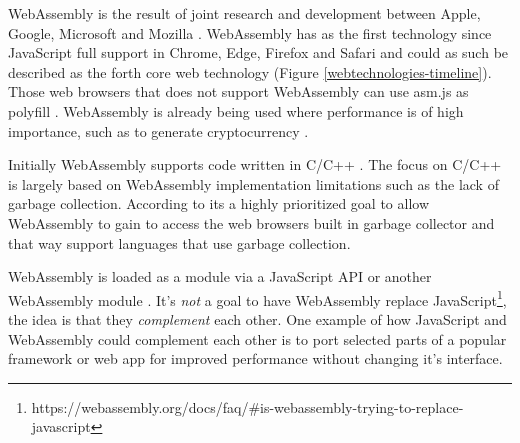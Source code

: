 
WebAssembly is the result of joint research and development between Apple, Google, Microsoft and Mozilla \parencite{HaasRossbergSchuffTitzerHolmanGohmanWagnerZakaiBastien2017}. WebAssembly has as the first technology since JavaScript full support in Chrome, Edge, Firefox and Safari and could as such be described as the forth core web technology (Figure \ref{webtechnologies-timeline}). Those web browsers that does not support WebAssembly can use asm.js as polyfill \parencite{HaasRossbergSchuffTitzerHolmanGohmanWagnerZakaiBastien2017}. WebAssembly is already being used where performance is of high importance, such as to generate cryptocurrency \parencite{RuthZimmermannWolsingHohlfeld2018}.

Initially WebAssembly supports code written in C/C++ \parencite{HaasRossbergSchuffTitzerHolmanGohmanWagnerZakaiBastien2017}. 
The focus on C/C++ is largely based on WebAssembly implementation limitations such as the lack of garbage collection. According to \textcite{HaasRossbergSchuffTitzerHolmanGohmanWagnerZakaiBastien2017} its a highly prioritized goal to allow WebAssembly to gain to access the web browsers built in garbage collector and that way support languages that use garbage collection.

WebAssembly is loaded as a module via a JavaScript API or another WebAssembly module \parencite{HaasRossbergSchuffTitzerHolmanGohmanWagnerZakaiBastien2017}. It's \emph{not} a goal to have WebAssembly replace JavaScript\footnote{https://webassembly.org/docs/faq/\#is-webassembly-trying-to-replace-javascript}, the idea is that they \emph{complement} each other. One example of how JavaScript and WebAssembly could complement each other is to port selected parts of a popular framework or web app for improved performance without changing it's interface.





